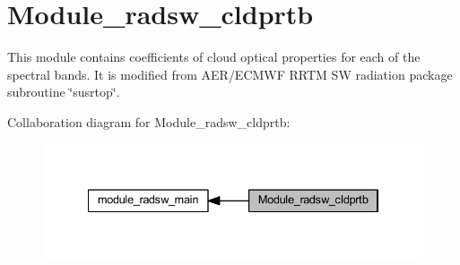 \hypertarget{group__module__radsw__cldprtb}{}\section{Module\+\_\+radsw\+\_\+cldprtb}
\label{group__module__radsw__cldprtb}


This module contains coefficients of cloud optical properties for each of the spectral bands. It is modified from A\+E\+R/\+E\+C\+M\+WF R\+R\+TM SW radiation package subroutine \char`\"{}susrtop\char`\"{}.  


Collaboration diagram for Module\+\_\+radsw\+\_\+cldprtb\+:\nopagebreak
\begin{figure}[H]
\begin{center}
\leavevmode
\includegraphics[width=334pt]{group__module__radsw__cldprtb}
\end{center}
\end{figure}
